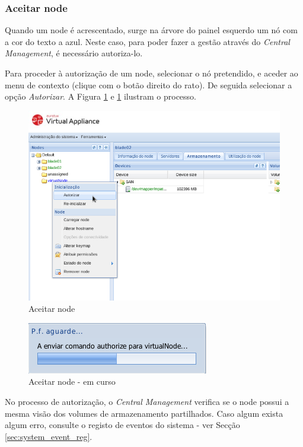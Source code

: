 {\subsubsection{Aceitar node}
Quando um node é acrescentado, surge na árvore do painel esquerdo um nó com a cor do texto a azul. Neste caso, para poder fazer a gestão através do \textit{Central Management}, é necessário autoriza-lo.

Para proceder à autorização de um node, selecionar o nó pretendido, e aceder ao menu de contexto (clique com o botão direito do rato). De seguida selecionar a opção \textit{Autorizar}. A Figura \ref{fig:cluster-auth} e \ref{fig:cluster-auth} ilustram o processo.

\begin{figure}[H]
        \begin{center}
        \includegraphics[scale=0.6]{screenshots/cluster-auth.png}
        \caption{Aceitar node}
        \label{fig:cluster-auth}
        \end{center}
\end{figure}

\begin{figure}[H]
        \begin{center}
        \includegraphics[scale=0.6]{screenshots/cluster-auth1.png}
        \caption{Aceitar node - em curso}
        \label{fig:cluster-auth1}
        \end{center}
\end{figure}

No processo de autorização, o \textit{Central Management} verifica se o node possui a mesma visão dos volumes de armazenamento partilhados. Caso algum exista algum erro, consulte o registo de eventos do sistema - ver Secção \ref{sec:system_event_reg}.
} %
 
